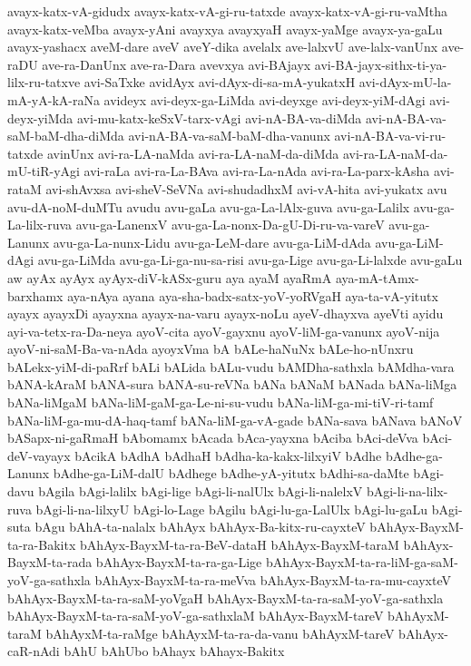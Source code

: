 {avayx-katx-vA-gidudx
avayx-katx-vA-gi-ru-tatxde
avayx-katx-vA-gi-ru-vaMtha
avayx-katx-veMba
avayx-yAni
avayxya
avayxyaH
avayx-yaMge
avayx-ya-gaLu
avayx-yashacx
aveM-dare
aveV
aveY-dika
avelalx
ave-lalxvU
ave-lalx-vanUnx
ave-raDU
ave-ra-DanUnx
ave-ra-Dara
avevxya
avi-BAjayx
avi-BA-jayx-sithx-ti-ya-lilx-ru-tatxve
avi-SaTxke
avidAyx
avi-dAyx-di-sa-mA-yukatxH
avi-dAyx-mU-la-mA-yA-kA-raNa
avideyx
avi-deyx-ga-LiMda
avi-deyxge
avi-deyx-yiM-dAgi
avi-deyx-yiMda
avi-mu-katx-keSxV-tarx-vAgi
avi-nA-BA-va-diMda
avi-nA-BA-va-saM-baM-dha-diMda
avi-nA-BA-va-saM-baM-dha-vanunx
avi-nA-BA-va-vi-ru-tatxde
avinUnx
avi-ra-LA-naMda
avi-ra-LA-naM-da-diMda
avi-ra-LA-naM-da-mU-tiR-yAgi
avi-raLa
avi-ra-La-BAva
avi-ra-La-nAda
avi-ra-La-parx-kAsha
avi-rataM
avi-shAvxsa
avi-sheV-SeVNa
avi-shudadhxM
avi-vA-hita
avi-yukatx
avu
avu-dA-noM-duMTu
avudu
avu-gaLa
avu-ga-La-lAlx-guva
avu-ga-Lalilx
avu-ga-La-lilx-ruva
avu-ga-LanenxV
avu-ga-La-nonx-Da-gU-Di-ru-va-vareV
avu-ga-Lanunx
avu-ga-La-nunx-Lidu
avu-ga-LeM-dare
avu-ga-LiM-dAda
avu-ga-LiM-dAgi
avu-ga-LiMda
avu-ga-Li-ga-nu-sa-risi
avu-ga-Lige
avu-ga-Li-lalxde
avu-gaLu
aw
ayAx
ayAyx
ayAyx-diV-kASx-guru
aya
ayaM
ayaRmA
aya-mA-tAmx-barxhamx
aya-nAya
ayana
aya-sha-badx-satx-yoV-yoRVgaH
aya-ta-vA-yitutx
ayayx
ayayxDi
ayayxna
ayayx-na-varu
ayayx-noLu
ayeV-dhayxva
ayeVti
ayidu
ayi-va-tetx-ra-Da-neya
ayoV-cita
ayoV-gayxnu
ayoV-liM-ga-vanunx
ayoV-nija
ayoV-ni-saM-Ba-va-nAda
ayoyxVma
bA
bALe-haNuNx
bALe-ho-nUnxru
bALekx-yiM-di-paRrf
bALi
bALida
bALu-vudu
bAMDha-sathxla
bAMdha-vara
bANA-kAraM
bANA-sura
bANA-su-reVNa
bANa
bANaM
bANada
bANa-liMga
bANa-liMgaM
bANa-liM-gaM-ga-Le-ni-su-vudu
bANa-liM-ga-mi-tiV-ri-tamf
bANa-liM-ga-mu-dA-haq-tamf
bANa-liM-ga-vA-gade
bANa-sava
bANava
bANoV
bASapx-ni-gaRmaH
bAbomamx
bAcada
bAca-yayxna
bAciba
bAci-deVva
bAci-deV-vayayx
bAcikA
bAdhA
bAdhaH
bAdha-ka-kakx-lilxyiV
bAdhe
bAdhe-ga-Lanunx
bAdhe-ga-LiM-dalU
bAdhege
bAdhe-yA-yitutx
bAdhi-sa-daMte
bAgi-davu
bAgila
bAgi-lalilx
bAgi-lige
bAgi-li-nalUlx
bAgi-li-nalelxV
bAgi-li-na-lilx-ruva
bAgi-li-na-lilxyU
bAgi-lo-Lage
bAgilu
bAgi-lu-ga-LalUlx
bAgi-lu-gaLu
bAgi-suta
bAgu
bAhA-ta-nalalx
bAhAyx
bAhAyx-Ba-kitx-ru-cayxteV
bAhAyx-BayxM-ta-ra-Bakitx
bAhAyx-BayxM-ta-ra-BeV-dataH
bAhAyx-BayxM-taraM
bAhAyx-BayxM-ta-rada
bAhAyx-BayxM-ta-ra-ga-Lige
bAhAyx-BayxM-ta-ra-liM-ga-saM-yoV-ga-sathxla
bAhAyx-BayxM-ta-ra-meVva
bAhAyx-BayxM-ta-ra-mu-cayxteV
bAhAyx-BayxM-ta-ra-saM-yoVgaH
bAhAyx-BayxM-ta-ra-saM-yoV-ga-sathxla
bAhAyx-BayxM-ta-ra-saM-yoV-ga-sathxlaM
bAhAyx-BayxM-tareV
bAhAyxM-taraM
bAhAyxM-ta-raMge
bAhAyxM-ta-ra-da-vanu
bAhAyxM-tareV
bAhAyx-caR-nAdi
bAhU
bAhUbo
bAhayx
bAhayx-Bakitx
}
